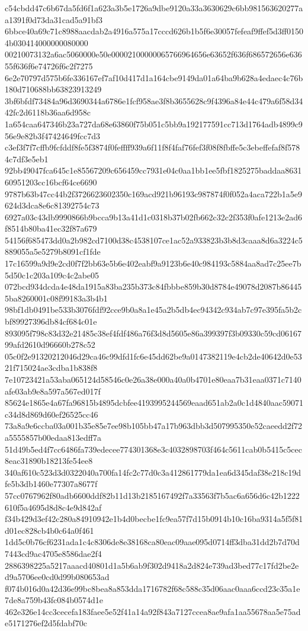 {c54cbdd47c6b67da5fd6f1a623a3b5e1726a9dbe9120a33a3630629c6bb981563620277aa1391f0d73da31cad5a91bf3
6bbce40a69c71c8988aacdab2a4916a575a17cccd626b1b5f6e30057fefeaf9ffef5d3ff01504b030414000000080000
00210073132a6ac5060000e50e00002100000065766964656e63652f636f686572656e63655f636f6e74726f6c2f7275
6e2e70797d575b6fe336167ef7af10d417d1a164cbe9149da01a64ba9b628a4edaec4c76b180d710688bb63823913249
3bf6bfdf73484a96d3690344a6786e1fcf958ae3f8b3655628c9f4396a84e44c479a6f58d3442fc2d6118b36aa6d958c
1a654caa647346b23a727da68e63860f75b051c5bb9a192177591cc713d1764adb4899c956e9e82b3f47424649fcc7d3
c3ef3f7f7cffb9fcfddf8fe5f3874f0feffff939a6f11f8f4faf76fef3f08f8fbffe5c3ebeffefaf8f5784c7df3e5eb1
92bb49047fca645c1e85567209c656459cc7931e04c0aa1bb1ee5fbf1825275baddaa863160951203cc16bcf64ce6690
9787b63b47cc44b2f3726623602350c169acd921b96193c987874f0f052a4aca722b1a5e9624d3dca8e6c81392754c73
6927a03c43db9990866b9bcca9b13a41d1c0318b37b02fb662c32c2f353f0afe1213e2ad6f8514b80ba41ec32f87a679
54156f685473dd0a2b982cd7100d38c4538107ce1ac52a933823b3b8d3caaa8d6a3224c5889055a5e5279b8091cf1fde
17c16599a9d9e2cd0f7f2bb63e5b6e402eabf9a9123b6e40c984193c5884aa8ad7c25ee7b5d50c1c203a109c4c2abe05
072bcd934dcda4e48da1915a83ba235b373c84fbbbe859b30d8784e49078d2087b864455ba8260001c08f99183a3b4b1
98bf1db0491be533b3076fdf92cce9b0a8a1e45a2b5db4ec94342c934ab7c97e395fa5b2cbf89927396db84cf684c01e
893095f798c83d32e21485c38ef4fdf486a76f3d8d5605e86a399397f3b09330c59cd0616799afd2610d96660b278c52
05c0f2e91320212046d29ca46c99dfd1fc6e45dd62be9a0147382119e4cb2de40642d0e5321f715024ae3cdba1b838f8
7e10723421a53aba065124d58546c0e26a38e000a40a0b4701e80eaa7b31eaa0371c7140afe03ab9e8a597a567ed017f
85624e1865e4a67fa96815b4895dcbfee4193995244569eaad651ab2a0c1d4840aac59071c34d8d869d60ef26525cc46
73a8a9e6ccba03a001b35e85e7ee98b105bb47a17b963dbb3d507995350e52caeedd2f72a5555857b00edaa813edff7a
51d49b5ed4f7cc6486fa739edecee774301368e3c4032898703f464c5611cab0b5415c5cec8eac31890b18213fe54ee8
340af610c523d3d0322040a700fa14fc2c77d0c3a412861779da1ea6d345daf38e218c19dfe5b3db1460e77307a8677f
57cc0767962f80adb6600ddf82b11d13b2185167492f7a33563f7b5ac6a656d6c42b1222610f5a4695d8d8c4e9d842af
f34b429d3ef42c280a84910942e1b4d0becbe1fc9ea57f7d15b0914b10c16ba9314a5f5f81d01ec828cb4b0c64a0f461
1dd5c0b76cf6231ada1c4c8306de8e38168ca80eac09aae095d0714ff3dba31dd2b7d70d7443cd9ac4705e8586dae2f4
2886398225a5217aaacd40801d1a5b6ab9f302d9418a2d824e739ad3bed77c17fd2be2ed9a5706ee0cd0d99b080653ad
f074b016d0a42d36e99bc8bea8a853dda1716782f68c588c35d06aac0aaa6ccd23c35a1e7de8a759b43fc084b0574d1e
462e326e14cc3cecefa183faee5e52f41a14a92f843a7127ccea8ae9afa1aa55678aa5e75ade5171276ef2d5fdabf70c
}

